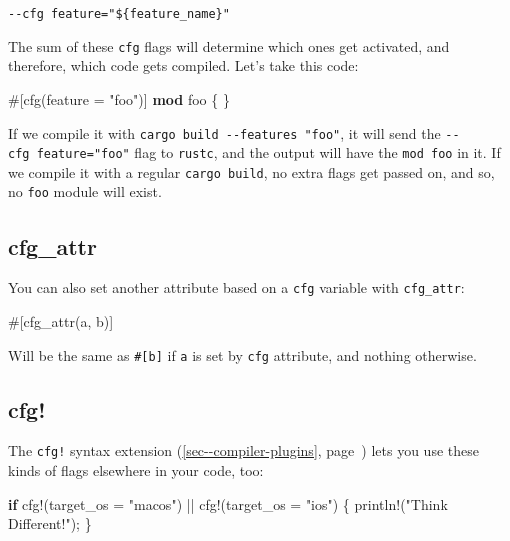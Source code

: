 \documentclass[a4paper,]{book}
\renewcommand*{\hyperref}[2][\ar]{%
  \def\ar{#2}%
  #2 (\autoref{#1}, page~\pageref{#1})}
\newenvironment{Shaded}{\begin{snugshade}}{\end{snugshade}}
\newcommand{\KeywordTok}[1]{\textcolor[rgb]{0.13,0.29,0.53}{\textbf{{#1}}}}
\newcommand{\StringTok}[1]{\textcolor[rgb]{0.31,0.60,0.02}{{#1}}}
\newcommand{\OtherTok}[1]{\textcolor[rgb]{0.56,0.35,0.01}{{#1}}}
\newcommand{\NormalTok}[1]{{#1}}
\begin{document}
\begin{verbatim}
--cfg feature="${feature_name}"
\end{verbatim}

The sum of these \texttt{cfg} flags will determine which ones get
activated, and therefore, which code gets compiled. Let's take this
code:

\begin{Shaded}
\begin{Highlighting}[]
\OtherTok{#[}\NormalTok{cfg}\OtherTok{(}\NormalTok{feature }\OtherTok{=} \StringTok{"foo"}\OtherTok{)]}
\KeywordTok{mod} \NormalTok{foo \{}
\NormalTok{\}}
\end{Highlighting}
\end{Shaded}

If we compile it with \texttt{cargo\ build\ -\/-features\ "foo"}, it
will send the \texttt{-\/-cfg\ feature="foo"} flag to \texttt{rustc},
and the output will have the \texttt{mod\ foo} in it. If we compile it
with a regular \texttt{cargo\ build}, no extra flags get passed on, and
so, no \texttt{foo} module will exist.

\subsection{cfg\_attr}\label{cfgux5fattr}

You can also set another attribute based on a \texttt{cfg} variable with
\texttt{cfg\_attr}:

\begin{Shaded}
\begin{Highlighting}[]
\OtherTok{#[}\NormalTok{cfg_attr}\OtherTok{(}\NormalTok{a}\OtherTok{,} \NormalTok{b}\OtherTok{)]}
\end{Highlighting}
\end{Shaded}

Will be the same as \texttt{\#{[}b{]}} if \texttt{a} is set by
\texttt{cfg} attribute, and nothing otherwise.

\subsection{cfg!}\label{cfg}

The \texttt{cfg!} \hyperref[sec--compiler-plugins]{syntax extension}
lets you use these kinds of flags elsewhere in your code, too:

\begin{Shaded}
\begin{Highlighting}[]
\KeywordTok{if} \OtherTok{cfg!}\NormalTok{(target_os = }\StringTok{"macos"}\NormalTok{) || }\OtherTok{cfg!}\NormalTok{(target_os = }\StringTok{"ios"}\NormalTok{) \{}
    \OtherTok{println!}\NormalTok{(}\StringTok{"Think Different!"}\NormalTok{);}
\NormalTok{\}}
\end{Highlighting}
\end{Shaded}
\end{document}
